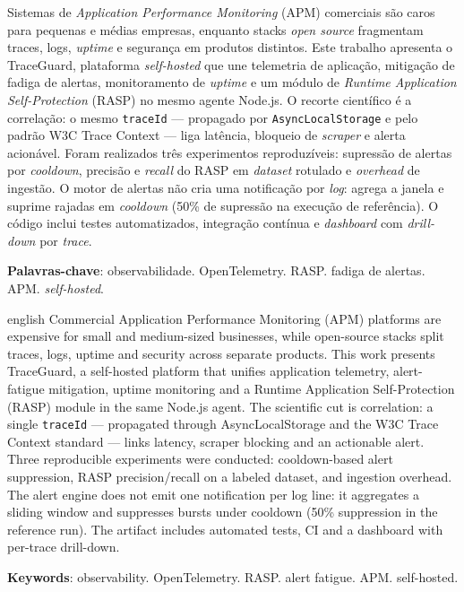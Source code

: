 \documentclass[
  12pt,
  oneside,
  a4paper,
  english,
  brazil,
  sumario=tradicional
]{abntex2}
\begin{document}
\frenchspacing

\imprimircapa
\imprimirfolhaderosto*

\begin{resumo}
Sistemas de \textit{Application Performance Monitoring} (APM) comerciais são caros para pequenas e médias empresas, enquanto stacks \textit{open source} fragmentam traces, logs, \textit{uptime} e segurança em produtos distintos. Este trabalho apresenta o TraceGuard, plataforma \textit{self-hosted} que une telemetria de aplicação, mitigação de fadiga de alertas, monitoramento de \textit{uptime} e um módulo de \textit{Runtime Application Self-Protection} (RASP) no mesmo agente Node.js. O recorte científico é a correlação: o mesmo \texttt{traceId} --- propagado por \texttt{AsyncLocalStorage} e pelo padrão W3C Trace Context --- liga latência, bloqueio de \textit{scraper} e alerta acionável. Foram realizados três experimentos reproduzíveis: supressão de alertas por \textit{cooldown}, precisão e \textit{recall} do RASP em \textit{dataset} rotulado e \textit{overhead} de ingestão. O motor de alertas não cria uma notificação por \textit{log}: agrega a janela e suprime rajadas em \textit{cooldown} (50\% de supressão na execução de referência). O código inclui testes automatizados, integração contínua e \textit{dashboard} com \textit{drill-down} por \textit{trace}.

\vspace{\onelineskip}
\noindent
\textbf{Palavras-chave}: observabilidade. OpenTelemetry. RASP. fadiga de alertas. APM. \textit{self-hosted}.
\end{resumo}

\begin{resumo}[Abstract]
 \begin{otherlanguage*}{english}
Commercial Application Performance Monitoring (APM) platforms are expensive for small and medium-sized businesses, while open-source stacks split traces, logs, uptime and security across separate products. This work presents TraceGuard, a self-hosted platform that unifies application telemetry, alert-fatigue mitigation, uptime monitoring and a Runtime Application Self-Protection (RASP) module in the same Node.js agent. The scientific cut is correlation: a single \texttt{traceId} --- propagated through AsyncLocalStorage and the W3C Trace Context standard --- links latency, scraper blocking and an actionable alert. Three reproducible experiments were conducted: cooldown-based alert suppression, RASP precision/recall on a labeled dataset, and ingestion overhead. The alert engine does not emit one notification per log line: it aggregates a sliding window and suppresses bursts under cooldown (50\% suppression in the reference run). The artifact includes automated tests, CI and a dashboard with per-trace drill-down.

\vspace{\onelineskip}
\noindent
\textbf{Keywords}: observability. OpenTelemetry. RASP. alert fatigue. APM. self-hosted.
 \end{otherlanguage*}
\end{resumo}
\end{document}
